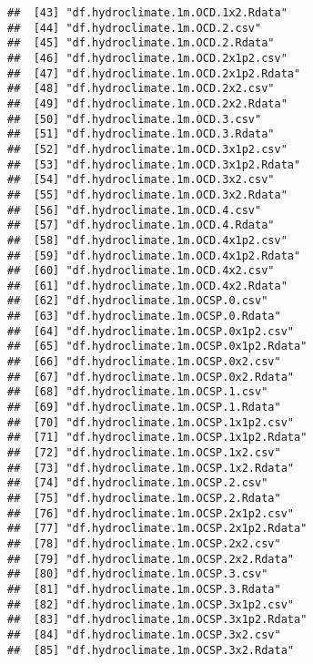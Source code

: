 \documentclass[
]{article}
\begin{document}
\begin{verbatim}
##  [43] "df.hydroclimate.1m.OCD.1x2.Rdata"                 
##  [44] "df.hydroclimate.1m.OCD.2.csv"                     
##  [45] "df.hydroclimate.1m.OCD.2.Rdata"                   
##  [46] "df.hydroclimate.1m.OCD.2x1p2.csv"                 
##  [47] "df.hydroclimate.1m.OCD.2x1p2.Rdata"               
##  [48] "df.hydroclimate.1m.OCD.2x2.csv"                   
##  [49] "df.hydroclimate.1m.OCD.2x2.Rdata"                 
##  [50] "df.hydroclimate.1m.OCD.3.csv"                     
##  [51] "df.hydroclimate.1m.OCD.3.Rdata"                   
##  [52] "df.hydroclimate.1m.OCD.3x1p2.csv"                 
##  [53] "df.hydroclimate.1m.OCD.3x1p2.Rdata"               
##  [54] "df.hydroclimate.1m.OCD.3x2.csv"                   
##  [55] "df.hydroclimate.1m.OCD.3x2.Rdata"                 
##  [56] "df.hydroclimate.1m.OCD.4.csv"                     
##  [57] "df.hydroclimate.1m.OCD.4.Rdata"                   
##  [58] "df.hydroclimate.1m.OCD.4x1p2.csv"                 
##  [59] "df.hydroclimate.1m.OCD.4x1p2.Rdata"               
##  [60] "df.hydroclimate.1m.OCD.4x2.csv"                   
##  [61] "df.hydroclimate.1m.OCD.4x2.Rdata"                 
##  [62] "df.hydroclimate.1m.OCSP.0.csv"                    
##  [63] "df.hydroclimate.1m.OCSP.0.Rdata"                  
##  [64] "df.hydroclimate.1m.OCSP.0x1p2.csv"                
##  [65] "df.hydroclimate.1m.OCSP.0x1p2.Rdata"              
##  [66] "df.hydroclimate.1m.OCSP.0x2.csv"                  
##  [67] "df.hydroclimate.1m.OCSP.0x2.Rdata"                
##  [68] "df.hydroclimate.1m.OCSP.1.csv"                    
##  [69] "df.hydroclimate.1m.OCSP.1.Rdata"                  
##  [70] "df.hydroclimate.1m.OCSP.1x1p2.csv"                
##  [71] "df.hydroclimate.1m.OCSP.1x1p2.Rdata"              
##  [72] "df.hydroclimate.1m.OCSP.1x2.csv"                  
##  [73] "df.hydroclimate.1m.OCSP.1x2.Rdata"                
##  [74] "df.hydroclimate.1m.OCSP.2.csv"                    
##  [75] "df.hydroclimate.1m.OCSP.2.Rdata"                  
##  [76] "df.hydroclimate.1m.OCSP.2x1p2.csv"                
##  [77] "df.hydroclimate.1m.OCSP.2x1p2.Rdata"              
##  [78] "df.hydroclimate.1m.OCSP.2x2.csv"                  
##  [79] "df.hydroclimate.1m.OCSP.2x2.Rdata"                
##  [80] "df.hydroclimate.1m.OCSP.3.csv"                    
##  [81] "df.hydroclimate.1m.OCSP.3.Rdata"                  
##  [82] "df.hydroclimate.1m.OCSP.3x1p2.csv"                
##  [83] "df.hydroclimate.1m.OCSP.3x1p2.Rdata"              
##  [84] "df.hydroclimate.1m.OCSP.3x2.csv"                  
##  [85] "df.hydroclimate.1m.OCSP.3x2.Rdata"                

\end{verbatim}
\end{document}
